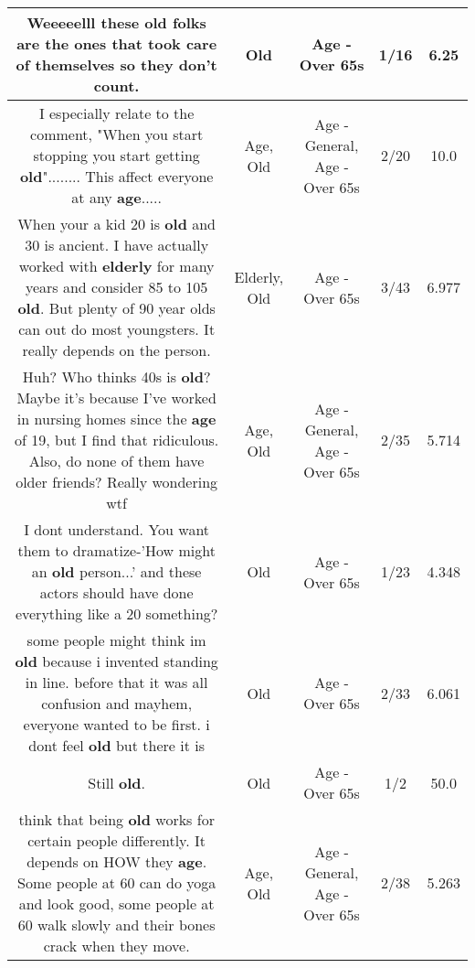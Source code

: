 \documentclass[11pt]{article}
\newlength\mylength
\begin{document}
\begin{center}
\begin{longtable}{|C{.65\mylength}|C{.30\mylength}|C{.12\mylength}|C{.12\mylength}|C{.12\mylength}|}
  \small Weeeeelll these \textbf{old} folks are the ones that took care of themselves so they don't count.\normalsize   & Old & Age - Over 65s & 1/16 & 6.25 \\  \hline
  \small I especially relate to the comment, "When you start stopping you start getting \textbf{old}"........ This affect everyone at any \textbf{age}.....\normalsize   & Age, Old & Age - General, Age - Over 65s & 2/20 & 10.0 \\  \hline
  \small When your a kid 20 is \textbf{old} and 30 is ancient. I have actually worked with \textbf{elderly} for many years and consider 85 to 105 \textbf{old}. But plenty of 90 year olds can out do most youngsters. It really depends on the person.\normalsize   & Elderly, Old & Age - Over 65s & 3/43 & 6.977 \\  \hline
  \small Huh? Who thinks 40s is \textbf{old}? Maybe it's because I've worked in nursing homes since the \textbf{age} of 19, but I find that ridiculous. Also, do none of them have older friends? Really wondering wtf\normalsize   & Age, Old & Age - General, Age - Over 65s & 2/35 & 5.714 \\  \hline
  \small I dont understand.  You want them to dramatize-'How might an \textbf{old} person...' and these actors should have done everything like a 20 something?\normalsize   & Old & Age - Over 65s & 1/23 & 4.348 \\  \hline
  \small some people might think im \textbf{old} because i invented standing in line. before that it was all confusion and mayhem, everyone wanted to be first. i dont feel \textbf{old} but there it is\normalsize   & Old & Age - Over 65s & 2/33 & 6.061 \\  \hline
  \small Still \textbf{old}.\normalsize   & Old & Age - Over 65s & 1/2 & 50.0 \\  \hline
  \small think that being \textbf{old} works for certain people differently. It depends on HOW they \textbf{age}. Some people at 60 can do yoga and look good, some people at 60 walk slowly and their bones crack when they move.\normalsize   & Age, Old & Age - General, Age - Over 65s & 2/38 & 5.263 \\  \hline

\end{longtable}
\end{center}
\end{document}
